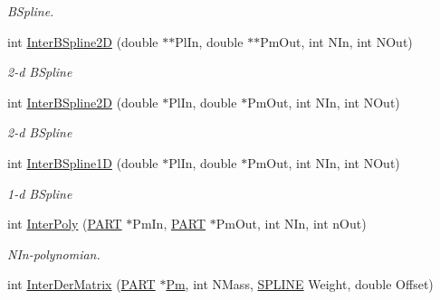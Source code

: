 \begin{DoxyCompactItemize}
\begin{DoxyCompactList}\small\item\em \-B\-Spline. \end{DoxyCompactList}\item 
\hypertarget{classVarData_af85ba08d7b5352f28f387d6bf36ed0b4}{int \hyperlink{classVarData_af85ba08d7b5352f28f387d6bf36ed0b4}{\-Inter\-B\-Spline2\-D} (double $\ast$$\ast$\-Pl\-In, double $\ast$$\ast$\-Pm\-Out, int \-N\-In, int \-N\-Out)}\label{classVarData_af85ba08d7b5352f28f387d6bf36ed0b4}

\begin{DoxyCompactList}\small\item\em 2-\/d \-B\-Spline \end{DoxyCompactList}\item 
int \hyperlink{classVarData_ab633e191b0a04ba858600f241be13e0f}{\-Inter\-B\-Spline2\-D} (double $\ast$\-Pl\-In, double $\ast$\-Pm\-Out, int \-N\-In, int \-N\-Out)
\begin{DoxyCompactList}\small\item\em 2-\/d \-B\-Spline \end{DoxyCompactList}\item 
\hypertarget{classVarData_aef3ce20f952bd216162301919ab01a3e}{int \hyperlink{classVarData_aef3ce20f952bd216162301919ab01a3e}{\-Inter\-B\-Spline1\-D} (double $\ast$\-Pl\-In, double $\ast$\-Pm\-Out, int \-N\-In, int \-N\-Out)}\label{classVarData_aef3ce20f952bd216162301919ab01a3e}

\begin{DoxyCompactList}\small\item\em 1-\/d \-B\-Spline \end{DoxyCompactList}\item 
\hypertarget{classVarData_a5141ff7cee13195dd687b6e42348f980}{int \hyperlink{classVarData_a5141ff7cee13195dd687b6e42348f980}{\-Inter\-Poly} (\hyperlink{structPART}{\-P\-A\-R\-T} $\ast$\-Pm\-In, \hyperlink{structPART}{\-P\-A\-R\-T} $\ast$\-Pm\-Out, int \-N\-In, int n\-Out)}\label{classVarData_a5141ff7cee13195dd687b6e42348f980}

\begin{DoxyCompactList}\small\item\em \-N\-In-\/polynomian. \end{DoxyCompactList}\item 
\hypertarget{classVarData_af85a557ebde1a4d48c3b228bde661087}{int \hyperlink{classVarData_af85a557ebde1a4d48c3b228bde661087}{\-Inter\-Der\-Matrix} (\hyperlink{structPART}{\-P\-A\-R\-T} $\ast$\hyperlink{classVarData_a53eee20378b4a2c61407897d98a4b5d7}{\-Pm}, int \-N\-Mass, \hyperlink{structSPLINE}{\-S\-P\-L\-I\-N\-E} \-Weight, double \-Offset)}\label{classVarData_af85a557ebde1a4d48c3b228bde661087}


\end{DoxyCompactItemize}
